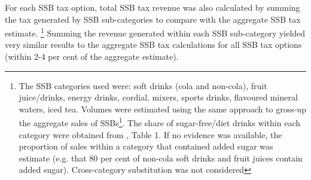\documentclass[embargoed]{grattan}
\begin{document}
For each SSB tax option, total SSB tax revenue was also calculated by summing the tax generated by SSB sub-categories to compare with the aggregate SSB tax estimate.%
\footnote{The SSB categories used were: soft drinks (cola and non-cola), fruit juice/drinks, energy drinks, cordial, mixers, sports drinks, flavoured mineral waters, iced tea.
Volumes were estimated using the same approach to gross-up the aggregate sales of SSBs\footcites{IBISWorld2016SoftDrinkManufacturing}{IBISWorld2016FruitJuiceDrink}{Media2015RetailWorldAnnual}.
The share of sugar-free/diet drinks within each category were obtained from \textcite{Levy2014QuenchingAustraliasthirst}, Table 1.
If no evidence was available, the proportion of sales within a category that contained added sugar was estimate (e.g. that 80 per cent of non-cola soft drinks and fruit juices contain added sugar).
Cross-category substitution was not considered} Summing the revenue generated within each SSB sub-category yielded very similar results to the aggregate SSB tax calculations for all SSB tax options (within 2-4 per cent of the aggregate estimate).

\printbibliography
\end{document}
